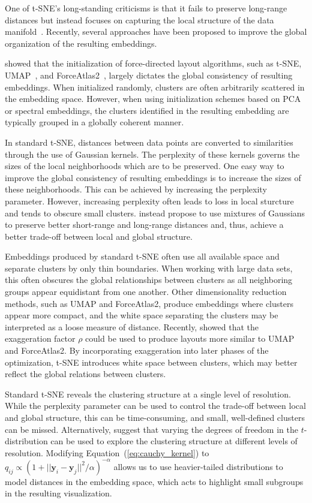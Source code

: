 \documentclass[article]{jss}
\begin{document}
One of t-SNE's long-standing criticisms is that it fails to preserve long-range
distances but instead focuses on capturing the local structure of the data
manifold~\citep{becht2019dimensionality}. Recently, several approaches have been
proposed to improve the global organization of the resulting embeddings.

\citet{kobak2019umap} showed that the initialization of force-directed layout
algorithms, such as t-SNE, UMAP~\citep{2018arXivUMAP}, and
ForceAtlas2~\citep{jacomy2014forceatlas2}, largely dictates the global
consistency of resulting embeddings. When initialized randomly, clusters are
often arbitrarily scattered in the embedding space. However, when using
initialization schemes based on PCA or spectral embeddings, the clusters
identified in the resulting embedding are typically grouped in a globally
coherent manner.

In standard t-SNE, distances between data points are converted to similarities
through the use of Gaussian kernels. The perplexity of these kernels governs the
sizes of the local neighborhoods which are to be preserved. One easy way to
improve the global consistency of resulting embeddings is to increase the sizes
of these neighborhoods. This can be achieved by increasing the perplexity
parameter. However, increasing perplexity often leads to loss in local sturcture
and tends to obscure small clusters. \citet{kobak2019art} instead propose to use
mixtures of Gaussians to preserve better short-range and long-range distances
and, thus, achieve a better trade-off between local and global structure.

Embeddings produced by standard t-SNE often use all available space and separate
clusters by only thin boundaries. When working with large data sets, this often
obscures the global relationships between clusters as all neighboring groups
appear equidistant from one another.  Other dimensionality reduction methods,
such as UMAP and ForceAtlas2, produce embeddings where clusters appear more
compact, and the white space separating the clusters may be interpreted as a
loose measure of distance. Recently, \citet{bohm2020unifying} showed that the
exaggeration factor $\rho$ could be used to produce layouts more similar to UMAP
and ForceAtlas2. By incorporating exaggeration into later phases of the
optimization, t-SNE introduces white space between clusters, which may better
reflect the global relations between clusters.

Standard t-SNE reveals the clustering structure at a single level of resolution.
While the perplexity parameter can be used to control the trade-off between
local and global structure, this can be time-consuming, and small, well-defined
clusters can be missed. Alternatively, \citet{kobak2019heavy} suggest that
varying the degrees of freedom in the $t$-distribution can be used to explore
the clustering structure at different levels of resolution. Modifying
Equation~(\ref{eq:cauchy_kernel}) to $q_{ij} \propto \left ( 1 + || \mathbf{y}_i -
\mathbf{y}_j ||^2 / \alpha \right )^{-\alpha}$ allows us to use heavier-tailed
distributions to model distances in the embedding space, which acts to highlight
small subgroups in the resulting visualization.
\end{document}
